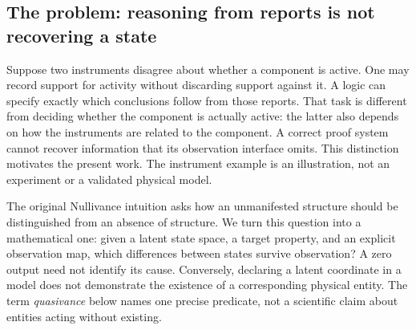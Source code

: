 \documentclass[11pt,a4paper]{article}
\begin{document}
\subsection{The problem: reasoning from reports is not recovering a state}
Suppose two instruments disagree about whether a component is active. One
may record support for activity without discarding support against it. A logic
can specify exactly which conclusions follow from those reports. That task is
different from deciding whether the component is actually active: the latter
also depends on how the instruments are related to the component. A correct
proof system cannot recover information that its observation interface omits.
This distinction motivates the present work. The instrument example is an
illustration, not an experiment or a validated physical model.

The original Nullivance intuition asks how an unmanifested structure should be
distinguished from an absence of structure. We turn this question into a
mathematical one: given a latent state space, a target property, and an explicit
observation map, which differences between states survive observation? A zero
output need not identify its cause. Conversely, declaring a latent coordinate
in a model does not demonstrate the existence of a corresponding physical entity.
The term \emph{quasivance} below names one precise predicate, not a scientific
claim about entities acting without existing.
\end{document}
